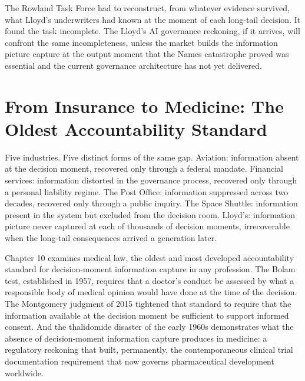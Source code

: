 The Rowland Task Force had to reconstruct, from whatever evidence survived, what Lloyd's underwriters had known at the moment of each long-tail decision. It found the task incomplete. The Lloyd's AI governance reckoning, if it arrives, will confront the same incompleteness, unless the market builds the information picture capture at the output moment that the Names catastrophe proved was essential and the current governance architecture has not yet delivered.

\scenebreak

\section{From Insurance to Medicine: The Oldest Accountability Standard}

Five industries. Five distinct forms of the same gap. Aviation: information absent at the decision moment, recovered only through a federal mandate. Financial services: information distorted in the governance process, recovered only through a personal liability regime. The Post Office: information suppressed across two decades, recovered only through a public inquiry. The Space Shuttle: information present in the system but excluded from the decision room. Lloyd's: information picture never captured at each of thousands of decision moments, irrecoverable when the long-tail consequences arrived a generation later.

Chapter 10 examines medical law, the oldest and most developed accountability standard for decision-moment information capture in any profession. The Bolam test, established in 1957, requires that a doctor's conduct be assessed by what a responsible body of medical opinion would have done at the time of the decision. The Montgomery judgment of 2015 tightened that standard to require that the information available at the decision moment be sufficient to support informed consent. And the thalidomide disaster of the early 1960s demonstrates what the absence of decision-moment information capture produces in medicine: a regulatory reckoning that built, permanently, the contemporaneous clinical trial documentation requirement that now governs pharmaceutical development worldwide.

